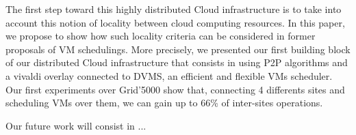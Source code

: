 The first step toward this highly distributed Cloud infrastructure is to take
into account this notion of locality between cloud computing resources.  In
this paper, we propose to show how such locality criteria can be considered in
former proposals of VM  schedulings. More precisely, we presented our first
building block of our distributed Cloud infrastructure that consists in using
P2P algorithms and a vivaldi overlay connected to DVMS, an efficient and
flexible VMs scheduler.  Our first experiments over Grid'5000 show that,
connecting 4 differents sites and scheduling VMs over them, we can gain up to
66\% of inter-sites operations. 

Our future work will consist in ... 
